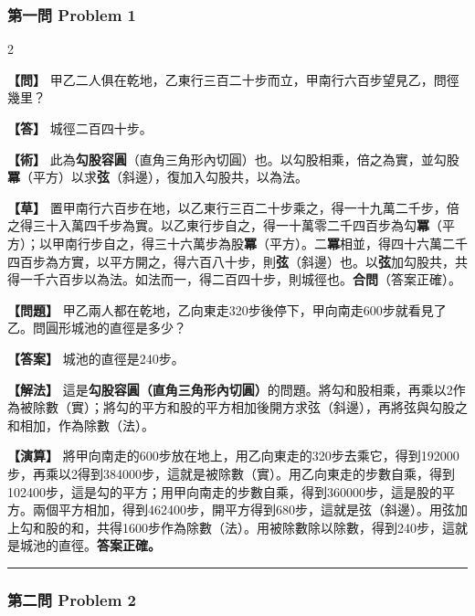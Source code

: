 \documentclass[11pt,a4paper]{article}
\newcommand{\wen}[1]{\par\noindent\textbf{\color{problemcolor}【問】} #1\par}
\newcommand{\da}[1]{\par\noindent\textbf{\color{problemcolor}【答】} #1\par}
\newcommand{\shu}[1]{\par\noindent\textbf{\color{problemcolor}【術】} #1\par}
\newcommand{\cao}[1]{\par\noindent\textbf{\color{problemcolor}【草】} #1\par}
\newcommand{\wenm}[1]{\par\noindent\textbf{\color{problemcolor}【問題】} #1\par}
\newcommand{\dam}[1]{\par\noindent\textbf{\color{problemcolor}【答案】} #1\par}
\newcommand{\shum}[1]{\par\noindent\textbf{\color{problemcolor}【解法】} #1\par}
\newcommand{\caom}[1]{\par\noindent\textbf{\color{problemcolor}【演算】} #1\par}
\begin{document}
\vspace{0.5cm}

\subsubsection*{第一問 \quad Problem 1}

\begin{paracol}{2}
\wen{甲乙二人俱在乾地，乙東行三百二十步而立，甲南行六百步望見乙，問徑幾里？}

\da{城徑二百四十步。}

\shu{此為\textbf{勾股容圓}（直角三角形內切圓）也。以勾股相乘，倍之為實，並勾股\textbf{冪}（平方）以求\textbf{弦}（斜邊），復加入勾股共，以為法。}

\cao{置甲南行六百步在地，以乙東行三百二十步乘之，得一十九萬二千步，倍之得三十入萬四千步為實。以乙東行步自之，得一十萬零二千四百步為勾\textbf{冪}（平方）；以甲南行步自之，得三十六萬步為股\textbf{冪}（平方）。二\textbf{冪}相並，得四十六萬二千四百步為方實，以平方開之，得六百八十步，則\textbf{弦}（斜邊）也。以\textbf{弦}加勾股共，共得一千六百步以為法。如法而一，得二百四十步，則城徑也。\textbf{合問}（答案正確）。}

\switchcolumn
\wenm{甲乙兩人都在乾地，乙向東走320步後停下，甲向南走600步就看見了乙。問圓形城池的直徑是多少？}

\dam{城池的直徑是240步。}

\shum{這是\textbf{勾股容圓（直角三角形內切圓）}的問題。將勾和股相乘，再乘以2作為被除數（實）；將勾的平方和股的平方相加後開方求弦（斜邊），再將弦與勾股之和相加，作為除數（法）。}

\caom{將甲向南走的600步放在地上，用乙向東走的320步去乘它，得到192000步，再乘以2得到384000步，這就是被除數（實）。用乙向東走的步數自乘，得到102400步，這是勾的平方；用甲向南走的步數自乘，得到360000步，這是股的平方。兩個平方相加，得到462400步，開平方得到680步，這就是弦（斜邊）。用弦加上勾和股的和，共得1600步作為除數（法）。用被除數除以除數，得到240步，這就是城池的直徑。\textbf{答案正確。}}
\end{paracol}

\vspace{0.5cm}
\noindent\textcolor{rulecolor}{\rule{\textwidth}{0.4pt}}

\subsubsection*{第二問 \quad Problem 2}
\end{document}
